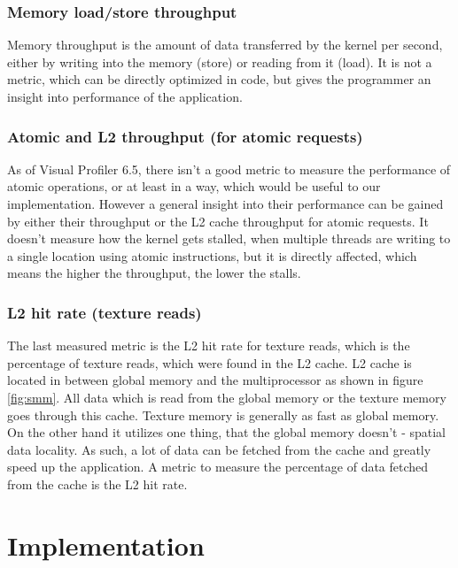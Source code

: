 \subsection{Memory load/store throughput}\label{subsec:metrics-memory-throughtput}

Memory throughput is the amount of data transferred by the kernel per second, either by writing into the memory (store) or reading from it (load). It is not a metric, which can be directly optimized in code, but gives the programmer an insight into performance of the application.

\subsection{Atomic and L2 throughput (for atomic requests)}\label{subsec:metrics-atomics-throughput}

As of Visual Profiler 6.5, there isn't a good metric to measure the performance of atomic operations, or at least in a way, which would be useful to our implementation. However a general insight into their performance can be gained by either their throughput or the L2 cache throughput for atomic requests. It doesn't measure how the kernel gets stalled, when multiple threads are writing to a single location using atomic instructions, but it is directly affected, which means the higher the throughput, the lower the stalls.

\subsection{L2 hit rate (texture reads)} \label{subsec:metrics-l2-hit-rate-texture}

The last measured metric is the L2 hit rate for texture reads, which is the percentage of texture reads, which were found in the L2 cache. L2 cache is located in between global memory and the multiprocessor as shown in figure \ref{fig:smm}. All data which is read from the global memory or the texture memory goes through this cache. Texture memory is generally as fast as global memory. On the other hand it utilizes one thing, that the global memory doesn't - spatial data locality. As such, a lot of data can be fetched from the cache and greatly speed up the application. A metric to measure the percentage of data fetched from the cache is the L2 hit rate.

\chapter{Implementation}\label{ch:implementation}

